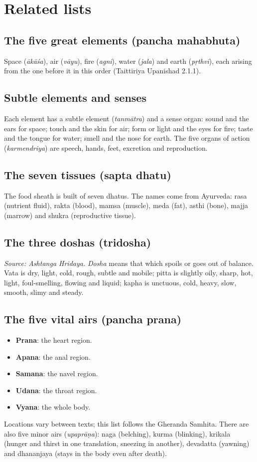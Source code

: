 
\section{Related lists}

\subsection*{The five great elements (pancha mahabhuta)}
Space (\emph{ākāśa}), air (\emph{vāyu}), fire (\emph{agni}), water (\emph{jala}) and earth (\emph{pṛthvī}), each arising from the one before it in this order (Taittiriya Upanishad 2.1.1).

\subsection*{Subtle elements and senses}
Each element has a subtle element (\emph{tanmātra}) and a sense organ: sound and the ears for space; touch and the skin for air; form or light and the eyes for fire; taste and the tongue for water; smell and the nose for earth. The five organs of action (\emph{karmendriya}) are speech, hands, feet, excretion and reproduction.

\subsection*{The seven tissues (sapta dhatu)}
The food sheath is built of seven dhatus. The names come from Ayurveda: rasa (nutrient fluid), rakta (blood), mamsa (muscle), meda (fat), asthi (bone), majja (marrow) and shukra (reproductive tissue).

\subsection*{The three doshas (tridosha)}
\textit{Source: Ashtanga Hridaya.} \emph{Dosha} means that which spoils or goes out of balance. Vata is dry, light, cold, rough, subtle and mobile; pitta is slightly oily, sharp, hot, light, foul-smelling, flowing and liquid; kapha is unctuous, cold, heavy, slow, smooth, slimy and steady.

\subsection*{The five vital airs (pancha prana)}
\begin{itemize}
\item \textbf{Prana}: the heart region.
\item \textbf{Apana}: the anal region.
\item \textbf{Samana}: the navel region.
\item \textbf{Udana}: the throat region.
\item \textbf{Vyana}: the whole body.
\end{itemize}
Locations vary between texts; this list follows the Gheranda Samhita. There are also five minor airs (\emph{upaprāṇa}): naga (belching), kurma (blinking), krikala (hunger and thirst in one translation, sneezing in another), devadatta (yawning) and dhananjaya (stays in the body even after death).

